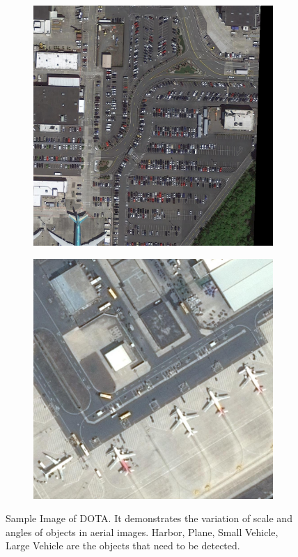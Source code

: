 \documentclass[conference]{IEEEtran}
\begin{document}
\begin{figure}[h!]
\begin{subfigure}[b]{0.4\linewidth}
  	\end{subfigure}
  	   	\begin{subfigure}[b]{0.4\linewidth}
    	\includegraphics[width=\linewidth]{P0023__1__1389___1848.png}
   	\end{subfigure}
  	\begin{subfigure}[b]{0.4\linewidth}
    	\includegraphics[width=\linewidth]{P0032__1__0___665.png}
  	\end{subfigure}
  	\caption{Sample Image of DOTA. It demonstrates the variation of scale and angles of objects in aerial images. Harbor, Plane, Small Vehicle, Large Vehicle are the objects that need to be detected.}
  	\label{fig:sample data}
	\end{figure}
\end{document}
